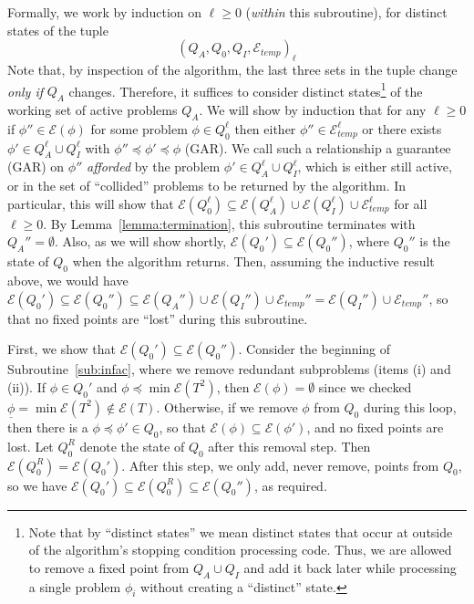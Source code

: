 \documentclass[11pt,reqno]{amsart}
\theoremstyle{definition}
\numberwithin{equation}{section}
\newcommand{\ul}{\underline}
\newcommand{\pre}{\phi}
\newcommand{\sub}{\subseteq}
\newcommand{\fix}{\mathcal{E}}
\newcommand{\peq}{\preceq}
\newcommand{\bopre}{\ul{\pre}}
\newcommand{\acto}{Q_0}
\newcommand{\acta}{Q_A}
\newcommand{\actc}{Q_I}
\newcommand{\fixtemp}{\mathcal{E}_{temp}}
\newcommand{\infacredi}{(i)\xspace}
\newcommand{\infacredii}{(ii)\xspace}
\begin{document}
Formally, we work by induction on $\ell \geq 0$ (\emph{within} this subroutine), for distinct states of the tuple \[(\acta,\acto,\actc,\fixtemp)_{\ell}\]
Note that, by inspection of the algorithm, the last three sets in the tuple change \emph{only if} $\acta$ changes. 
Therefore, it suffices to consider distinct states\footnote{Note that by ``distinct states'' we mean distinct states that occur at outside of the algorithm's stopping condition processing code.
Thus, we are allowed to remove a fixed point from $\acta \cup \actc$ and add it back later while processing a single problem $\pre_i$ without creating a ``distinct'' state.} of the working set of active problems $\acta$.
We will show by induction that for any $\ell \geq 0$ if $\pre'' \in \fix(\pre)$ for some problem $\pre \in \acto^{\ell}$ then either $\pre'' \in \fixtemp^{\ell}$ or there exists $\pre' \in \acta^{\ell} \cup \actc^{\ell}$ with $\pre'' \peq \pre' \peq \pre$ (GAR).
We call such a relationship a guarantee (GAR) on $\pre''$ \emph{afforded} by the problem $\pre' \in \acta^{\ell} \cup \actc^{\ell}$, which is either still active, or in the set of ``collided'' problems to be returned by the algorithm.
In particular, this will show that $\fix(\acto^{\ell}) \sub \fix(\acta^{\ell}) \cup \fix(\actc^{\ell}) \cup \fixtemp^{\ell}$ for all $\ell \geq 0$.
By Lemma~\ref{lemma:termination}, this subroutine terminates with $\acta'' = \emptyset$. 
Also, as we will show shortly, $\fix(\acto') \sub \fix(\acto'')$, where $\acto''$ is the state of $\acto$ when the algorithm returns. 
Then, assuming the inductive result above, we would have $\fix(\acto') \sub \fix(\acto'') \sub \fix(\acta'') \cup \fix(\actc'') \cup \fixtemp'' = \fix(\actc'') \cup \fixtemp''$, so that no fixed points are ``lost'' during this subroutine.

First, we show that $\fix(\acto') \sub \fix(\acto'')$. 
Consider the beginning of Subroutine~\ref{sub:infac}, where we remove redundant subproblems (items \infacredi and \infacredii).
If $\pre \in \acto'$ and $\pre \peq \min \fix(T^2)$, then $\fix(\pre) = \emptyset$ since we checked $\bopre = \min \fix(T^2) \not \in \fix(T)$. 
Otherwise, if we remove $\pre$ from $\acto$ during this loop, then there is a $\pre \peq \pre' \in \acto$, so that $\fix(\pre) \sub \fix(\pre')$, and no fixed points are lost.
Let $\acto^R$ denote the state of $\acto$ after this removal step.
Then $\fix(\acto^R) = \fix(\acto')$.
After this step, we only add, never remove, points from $\acto$, so we have $\fix(\acto') \sub \fix(\acto^R) \sub \fix(\acto'')$, as required.
\end{document}

